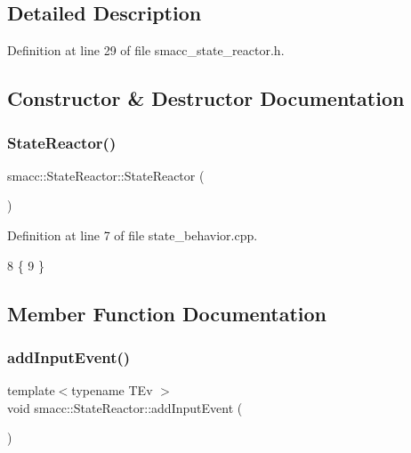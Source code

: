 \subsection{Detailed Description}


Definition at line 29 of file smacc\+\_\+state\+\_\+reactor.\+h.



\subsection{Constructor \& Destructor Documentation}
\mbox{\label{classsmacc_1_1StateReactor_ae319e9f7b0a2a80b4c5ace6ec8c99fb2}} 
\subsubsection{\texorpdfstring{State\+Reactor()}{StateReactor()}}
{\footnotesize\ttfamily smacc\+::\+State\+Reactor\+::\+State\+Reactor (\begin{DoxyParamCaption}{ }\end{DoxyParamCaption})}



Definition at line 7 of file state\+\_\+behavior.\+cpp.


\begin{DoxyCode}
8 \{
9 \}
\end{DoxyCode}


\subsection{Member Function Documentation}
\mbox{\label{classsmacc_1_1StateReactor_acd4b35b4c82241fc27bb858761f6e4de}} 
\subsubsection{\texorpdfstring{add\+Input\+Event()}{addInputEvent()}}
{\footnotesize\ttfamily template$<$typename T\+Ev $>$ \\
void smacc\+::\+State\+Reactor\+::add\+Input\+Event (\begin{DoxyParamCaption}{ }\end{DoxyParamCaption})}




